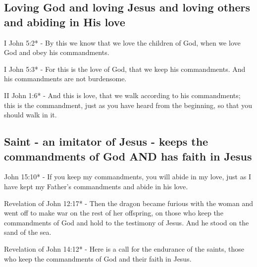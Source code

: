 \documentclass[11pt]{article}
\begin{document}
\subsection{Loving God and loving Jesus and loving others and abiding in His love}
\label{sec:orgf668d76}
I John 5:2* - By this we know that we love the children of God, when we love God and obey his commandments.

I John 5:3* - For this is the love of God, that we keep his commandments. And his commandments are not burdensome.

II John 1:6* - And this is love, that we walk according to his commandments; this is the commandment, just as you have heard from the beginning, so that you should walk in it.

\subsection{Saint - an imitator of Jesus - keeps the commandments of God AND has faith in Jesus}
\label{sec:org56ed973}
John 15:10* - If you keep my commandments, you will abide in my love, just as I have kept my Father's commandments and abide in his love.

Revelation of John 12:17* - Then the dragon became furious with the woman and went off to make war on the rest of her offspring, on those who keep the commandments of God and hold to the testimony of Jesus. And he stood on the sand of the sea.

Revelation of John 14:12* - Here is a call for the endurance of the saints, those who keep the commandments of God and their faith in Jesus.
\end{document}
